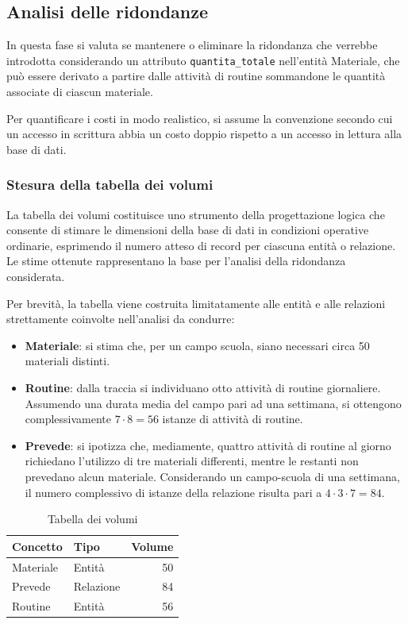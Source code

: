 \documentclass[11pt,a4paper]{article}
\begin{document}
\subsection{Analisi delle ridondanze}

In questa fase si valuta se mantenere o eliminare la ridondanza che verrebbe introdotta
considerando un attributo \texttt{quantita\_totale} nell'entità Materiale, che può essere
derivato a partire dalle attività di routine sommandone le quantità associate di ciascun
materiale.

Per quantificare i costi in modo realistico, si assume la convenzione secondo cui un accesso in
scrittura abbia un costo doppio rispetto a un accesso in lettura alla base di dati.

\subsubsection{Stesura della tabella dei volumi}

La tabella dei volumi costituisce uno strumento della progettazione logica che consente di
stimare le dimensioni della base di dati in condizioni operative ordinarie, esprimendo il
numero atteso di record per ciascuna entità o relazione. Le stime ottenute rappresentano la base
per l'analisi della ridondanza considerata.

Per brevità, la tabella viene costruita limitatamente alle entità e alle relazioni strettamente
coinvolte nell'analisi da condurre:

\begin{itemize}[nosep]
  \item \textbf{Materiale}: si stima che, per un campo scuola, siano necessari circa 50
    materiali distinti.
  \item \textbf{Routine}: dalla traccia si individuano otto attività di routine giornaliere.
    Assumendo una durata media del campo pari ad una settimana, si ottengono complessivamente
    $7 \cdot 8 = 56$ istanze di attività di routine.
  \item \textbf{Prevede}: si ipotizza che, mediamente, quattro attività di routine al giorno
    richiedano l'utilizzo di tre materiali differenti, mentre le restanti non prevedano alcun
    materiale. Considerando un campo-scuola di una settimana, il numero complessivo di istanze
    della relazione risulta pari a $4 \cdot 3 \cdot 7 = 84$.
\end{itemize}

\begin{table}[h]
\centering
\caption{Tabella dei volumi}
\label{tab:volumi}
\begin{tabular}{@{}llr@{}}
\toprule
\textbf{Concetto} & \textbf{Tipo} & \textbf{Volume} \\
\midrule
Materiale & Entità    & 50 \\
Prevede   & Relazione & 84 \\
Routine   & Entità    & 56 \\
\bottomrule
\end{tabular}
\end{table}
\end{document}
